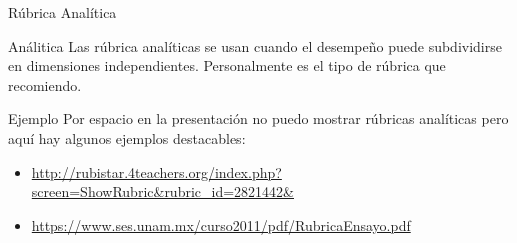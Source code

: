\documentclass[11pt, aspectratio=169, xcolor=table,hyphens]{beamer}
\begin{document}
\begin{frame}{Rúbrica Analítica}
	\begin{block}{Análitica}
		Las rúbrica analíticas se usan cuando el desempeño puede subdividirse en dimensiones independientes. Personalmente es el tipo de rúbrica que recomiendo.
	\end{block}
	\begin{exampleblock}{Ejemplo}
		Por espacio en la presentación no puedo mostrar rúbricas analíticas pero aquí hay algunos ejemplos destacables:
		\begin{itemize}
			\item \url{http://rubistar.4teachers.org/index.php?screen=ShowRubric&rubric_id=2821442&}
			\item \url{https://www.ses.unam.mx/curso2011/pdf/RubricaEnsayo.pdf}
		\end{itemize}
	\end{exampleblock}

\end{frame}
\end{document}
